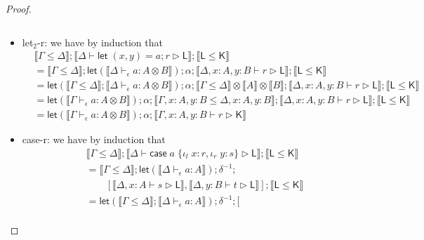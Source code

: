 \documentclass[acmsmall,screen,review]{acmart}
\newcommand{\ms}[1]{\ensuremath{\mathsf{#1}}}
\newcommand{\lto}{:}
\newcommand{\linl}[1]{\iota_l\;{#1}}
\newcommand{\linr}[1]{\iota_r\;{#1}}
\newcommand{\caseexpr}[5]{\ms{case}\;#1\;\{\linl{#2} \lto #3, \linr{#4} \lto #5\}}
\newcommand{\letstmt}[3]{\ensuremath{\ms{let}\;#1 = #2; #3}}
\newcommand{\bhyp}[2]{#1 : #2}
\newcommand{\hasty}[4]{#1 \vdash_{#2} #3: {#4}}
\newcommand{\haslb}[3]{#1 \vdash #2 \rhd #3}
\newcommand{\brle}[1]{{\textsf{#1}}}
\newcommand{\dnt}[1]{\llbracket{#1}\rrbracket}
\newcommand{\lmor}[1]{\ms{let}(#1)}
\begin{document}
\begin{proof}
\begin{itemize}
\begin{equation}
    \end{equation}
    \item \brle{let$_2$-r}: we have by induction that
    \begin{equation}
      \begin{aligned}
        & \dnt{\Gamma \leq \Delta} 
          ; \dnt{\haslb{\Delta}{\letstmt{(x, y)}{a}{r}}{\ms{L}}} 
          ; \dnt{\ms{L} \leq \ms{K}} \\
        & = \dnt{\Gamma \leq \Delta}
          ; \lmor{\dnt{\hasty{\Delta}{\epsilon}{a}{A \otimes B}}}
          ; \alpha
          ; \dnt{\haslb{\Delta, \bhyp{x}{A}, \bhyp{y}{B}}{r}{\ms{L}}}
          ; \dnt{\ms{L} \leq \ms{K}} \\
        & = \lmor{\dnt{\Gamma \leq \Delta} ; \dnt{\hasty{\Delta}{\epsilon}{a}{A \otimes B}}}
          ; \alpha
          ; \dnt{\Gamma \leq \Delta} \otimes \dnt{A} \otimes \dnt{B}
          ; \dnt{\haslb{\Delta, \bhyp{x}{A}, \bhyp{y}{B}}{r}{\ms{L}}}
          ; \dnt{\ms{L} \leq \ms{K}} \\
        & = \lmor{\dnt{\hasty{\Gamma}{\epsilon}{a}{A \otimes B}}}
          ; \alpha
          ; \dnt{\Gamma, \bhyp{x}{A}, \bhyp{y}{B} \leq \Delta, \bhyp{x}{A}, \bhyp{y}{B}}
          ; \dnt{\haslb{\Delta, \bhyp{x}{A}, \bhyp{y}{B}}{r}{\ms{L}}}
          ; \dnt{\ms{L} \leq \ms{K}} \\
        & = \lmor{\dnt{\hasty{\Gamma}{\epsilon}{a}{A \otimes B}}}
          ; \alpha
          ; \dnt{\haslb{\Gamma, \bhyp{x}{A}, \bhyp{y}{B}}{r}{\ms{K}}}
      \end{aligned}
    \end{equation}
    \item \brle{case-r}: we have by induction that
    \begin{equation}
      \begin{aligned}
        & \dnt{\Gamma \leq \Delta} 
          ; \dnt{\haslb{\Delta}{\caseexpr{a}{x}{r}{y}{s}}{\ms{L}}}
          ; \dnt{\ms{L} \leq \ms{K}} \\
        & = \dnt{\Gamma \leq \Delta}
          ; \lmor{\dnt{\hasty{\Delta}{\epsilon}{a}{A}}}
          ; \delta^{-1}
          ; \\ & \qquad [ 
             \dnt{\haslb{\Delta, \bhyp{x}{A}}{s}{\ms{L}}}, 
             \dnt{\haslb{\Delta, \bhyp{y}{B}}{t}{\ms{L}}}
          ]
          ; \dnt{\ms{L} \leq \ms{K}} \\
        & = \lmor{\dnt{\Gamma \leq \Delta} ; \dnt{\hasty{\Delta}{\epsilon}{a}{A}}}
          ; \delta^{-1}
          ; [ \\ & \qquad 

\end{aligned}
\end{equation}
\end{itemize}
\end{proof}
\end{document}
